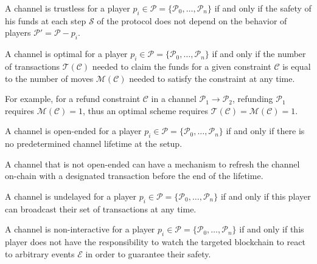 \begin{definition}[Trustless]
  A channel is trustless for a player $p_i \in \mathcal{P} = \{\mathcal{P}_0,
  \dots, \mathcal{P}_n\}$ if and only if the safety of his funds at each step
  $\mathcal{S}$ of the protocol does not depend on the behavior of players $\mathcal{P}' =
  \mathcal{P} - p_i$.
\end{definition}

\begin{definition}[Optimal]
  A channel is optimal for a player $p_i \in \mathcal{P} = \{\mathcal{P}_0, \dots,
  \mathcal{P}_n\}$ if and only if the number of transactions
  $\mathcal{T}(\mathcal{C})$ needed to claim the funds for a given constraint
  $\mathcal{C}$ is equal to the number of moves $\mathcal{M}(\mathcal{C})$ needed
  to satisfy the constraint at any time.
\end{definition}

For example, for a refund constraint $\mathcal{C}$ in a channel $\mathcal{P}_1 \rightarrow \mathcal{P}_2$,
refunding $\mathcal{P}_1$ requires $\mathcal{M}(\mathcal{C}) = 1$, thus
an optimal scheme requires $\mathcal{T}(\mathcal{C}) = \mathcal{M}(\mathcal{C}) = 1$.

\begin{definition}
  A channel is open-ended for a player $p_i \in \mathcal{P} = \{\mathcal{P}_0,
  \dots, \mathcal{P}_n\}$ if and only if there is no predetermined channel
  lifetime at the setup.
\end{definition}

A channel that is not open-ended can have a mechanism to refresh the channel
on-chain with a designated transaction before the end of the lifetime.

\begin{definition}[Undelayed]
  A channel is undelayed for a player $p_i \in \mathcal{P} = \{\mathcal{P}_0,
  \dots, \mathcal{P}_n\}$ if and only if this player can broadcast their set of
  transactions at any time.
\end{definition}

\begin{definition}
  A channel is non-interactive for a player $p_i \in \mathcal{P} =
  \{\mathcal{P}_0, \dots, \mathcal{P}_n\}$ if and only if this player does not
  have the responsibility to watch the targeted blockchain to react to arbitrary events $\mathcal{E}$ in order to guarantee their safety.
\end{definition}


